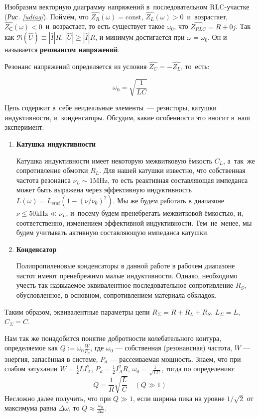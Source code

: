 \documentclass[12pt, a4paper]{article}
\begin{document}
Изобразим векторную диаграмму напряжений в~последовательном RLC-участке (\textit{Рис. \ref{udiag}}).
Поймём, что $\hat{Z_R} (\omega)  = \text{const}$, $\hat{Z_L} (\omega) >0$~и~возрастает, $\hat{Z_С} (\omega)<0$~и~возрастает, то есть существует такое $\omega_0$, что $\widehat{Z_{RLC}} = R + 0j$. Так как $\Re(\hat U) \equiv |\hat I| R$, $|\hat U| \geq |\hat I|R$, и минимум достигается при $\omega = \omega_0$. Он и называется \textbf{резонансом напряжений}.

Резонанс напряжений определяется из условия $\hat{Z_C} = -\hat{Z_L}$, то~есть:

\begin{equation}
  \omega_0 = \sqrt{\frac{1}{LC}}
  \label{omega0}
\end{equation}

\newpage
\renewcommand{\labelenumi}{(\alph{enumi})}
Цепь содержит в~себе неидеальные элементы~--- резисторы, катушки индуктивности, и~конденсаторы. Обсудим, какие особенности это вносит в~наш эксперимент.
\begin{enumerate}
  \item \textbf{Катушка индуктивности}

    Катушка индуктивности имеет некоторую межвитковую ёмкость $C_L$, а~так~же сопротивление обмотки $R_L$. Для нашей катушки известно, что собственная частота резонанса $\nu_L \sim 1\text{MHz}$, то есть реактивная составляющая импеданса может быть выражена через эффективную индуктивность $L(\omega) = L_{stat} (1-(\nu/\nu_0)^2)$. Мы же будем работать в диапазоне $\nu \leq 50 \text{kHz} \ll \nu_L$, и~посему будем пренебрегать межвитковой ёмкостью, и, соответственно, изменением эффективной индуктивности. Тем~не~менее, мы будем учитывать активную составляющую импеданса катушки.

  \item \textbf{Конденсатор}

    Полипропиленовые конденсаторы в данной работе в рабочем диапазоне частот имеют пренебрежимо малые индуктивности. Однако, необходимо учесть так назвыаемое эквивалентное последовательное сопротивление $R_S$, обусловленное, в основном, сопротивлением материала обкладок.
\end{enumerate}

Таким образом, эквивалентные параметры цепи $R_\Sigma = R + R_L + R_S$, $L_\Sigma = L$, $C_\Sigma = C$.

Нам так же понадобится понятие добротности колебательного контура, определяемое как ${Q := \omega_0 \frac{W}{P_d}}$, где $\omega_0$ --- собственная (резонансная) частота, $W$ --- энергия, запасённая в системе, $P_d$ --- рассеиваемая мощность. Знаем, что при слабом затухании $W = \frac 1 2 LI_A^2$, $P_d = \frac 1 2 I_A^2 R$, $\omega_0 = \frac{1}{\sqrt{LC}}$, тогда по определению:
\begin{equation}
  Q = \frac{1}{R} \sqrt{\frac L C} \quad \left(Q \gg 1\right)
  \label{Q}
\end{equation}
Несложно далее получить, что при $Q \gg 1$, если ширина пика на уровне $1/\sqrt 2$ от максимума равна $\Delta \omega$, то $Q \approx \frac{\omega_0}{\Delta\omega}$.
\end{document}
